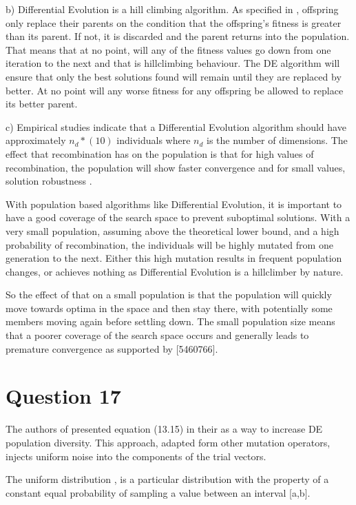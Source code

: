 \documentclass[12pt]{article}
\begin{document}
	b) Differential Evolution is a hill climbing algorithm. As specified in \cite{Storn1997}, offspring only replace their parents on the condition that the offspring's fitness is greater than its parent. If not, it is discarded and the parent returns into the population. That means that at no point, will any of the fitness values go down from one iteration to the next and that is hillclimbing behaviour. The DE algorithm will ensure that only the best solutions found will remain until they are replaced by better. At no point will any worse fitness for any offspring be allowed to replace its better parent.

	c) Empirical studies indicate that a Differential Evolution algorithm should have approximately $n_d*(10)$ individuals where $n_d$ is the number of dimensions. The effect that recombination has on the population is that for high values of recombination, the population will show faster convergence and for small values, solution robustness \cite{engelCI02}. 

	With population based algorithms like Differential Evolution, it is important to have a good coverage of the search space to prevent suboptimal solutions. With a very small population, assuming above the theoretical lower bound, and a high probability of recombination, the individuals will be highly mutated from one generation to the next. Either this high mutation results in frequent population changes, or achieves nothing as Differential Evolution is a hillclimber by nature. 

	So the effect of that on a small population is that the population will quickly move towards optima in the space and then stay there, with potentially some members moving again before settling down. The small population size means that a poorer coverage of the search space occurs and generally leads to premature convergence as supported by [5460766].
\section{Question 17}
The authors of \cite{chang_chang_1999} presented equation (13.15) in their as a way to increase DE population diversity. This approach, adapted form other mutation operators, injects uniform noise into the components of the trial vectors.

The uniform distribution \cite{wolframUniform}, is a particular distribution with the property of a constant equal probability of sampling a value between an interval [a,b].
\end{document}
